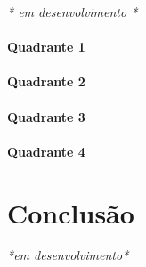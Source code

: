 \documentclass[
	12pt,				%
	openright,			%
	oneside,			%
	a4paper,			%
	english,			%
	brazil,				%
	]{abntex2}
\begin{document}
\emph{* em desenvolvimento *}

\subsubsection{Quadrante 1}


\subsubsection{Quadrante 2}

\subsubsection{Quadrante 3}

\subsubsection{Quadrante 4}


% 

\chapter*[Conclusão]{Conclusão}

\emph{*em desenvolvimento*}


\postextual


%


%
%


\printindex
\end{document}
